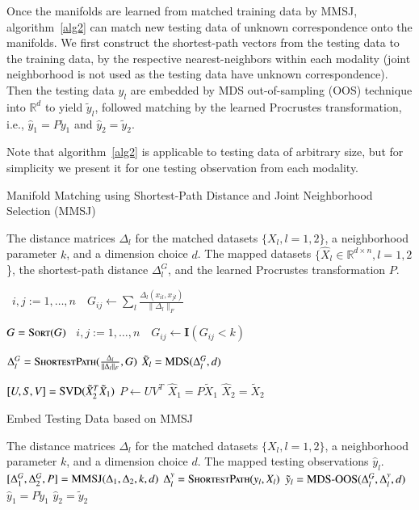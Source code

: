\documentclass[times,twocolumn,final]{elsarticle}
\newcommand{\Linefor}[2]{%
    \State \algorithmicfor\ {#1}\ \algorithmicdo\ {#2} \algorithmicend\ \algorithmicfor%
}
\newcommand{\rto}{\leftarrow}
\providecommand{\mb}[1]{\boldsymbol{#1}}
\begin{document}
Once the manifolds are learned from matched training data by MMSJ, algorithm~\ref{alg2} can match new testing data of unknown correspondence onto the manifolds. We first construct the shortest-path vectors from the testing data to the training data, by the respective nearest-neighbors within each modality (joint neighborhood is not used as the testing data have unknown correspondence). Then the testing data $y_{l}$ are embedded by MDS out-of-sampling (OOS) technique into $\mathbb{R}^{d}$ to yield $\tilde{y}_{l}$, followed matching by the learned Procrustes transformation, i.e., $\hat{y}_{1}=P \tilde{y}_{1}$ and $\hat{y}_{2}=\tilde{y}_{2}$.

Note that algorithm~\ref{alg2} is applicable to testing data of arbitrary size, but for simplicity we present it for one testing observation from each modality.

\begin{algorithm}
\caption{Manifold Matching using Shortest-Path Distance and Joint Neighborhood Selection (MMSJ)}
\label{alg1}
\begin{algorithmic}[1]
\Require The distance matrices $\Delta_{l}$ for the matched datasets $\{X_{l}, l=1,2\}$, a neighborhood parameter $k$, and a dimension choice $d$.
\Ensure The mapped datasets $\{\hat{X}_{l} \in \mathbb{R}^{d \times n}, l=1,2$\}, the shortest-path distance $\Delta_{l}^{G}$, and the learned Procrustes transformation $P$.

\Linefor{$i,j:=1,\ldots,n$}{$G_{ij} \rto \sum_{l} \frac{\Delta_{l}(x_{il},x_{jl})}{\|\Delta_{l}\|_{F}}$} 
\State $G = \textsc{Sort}(G)$ 
\Linefor{$i,j:=1,\ldots,n$}{$G_{ij} \rto \mb{I}(G_{ij} < k)$} 
\State $\Delta_{l}^{G} = \textsc{ShortestPath}(\frac{\Delta_{l}}{\|\Delta_{l}\|_{F}}, G)$ 
\State $\tilde{X}_{l}=\textsc{MDS}(\Delta_{l}^{G},d)$ 
\EndFor

\State $[U,S,V]=\textsc{SVD}(\tilde{X}_{2}^{T}\tilde{X}_{1})$ 
\State $P \rto UV^{T}$
\State $\hat{X}_{1}=P \tilde{X}_{1}$
\State $\hat{X}_{2}=\tilde{X}_{2}$
\EndFunction
\end{algorithmic}
\end{algorithm}

\begin{algorithm}
\caption{Embed Testing Data based on MMSJ}
\label{alg2}
\begin{algorithmic}
\Require The distance matrices $\Delta_{l}$ for the matched datasets $\{X_{l}, l=1,2\}$, a neighborhood parameter $k$, and a dimension choice $d$.
\Ensure The mapped testing observations $\hat{y}_{l}$. 
\State $[\Delta_{1}^{G},\Delta_{2}^{G},P]=\textsc{MMSJ}(\Delta_{1},\Delta_{2},k,d)$
\State $\Delta_{l}^{y} = \textsc{ShortestPath}(y_{l},X_{l})$ 
\State $\tilde{y}_{l}=\textsc{MDS-OOS}(\Delta_{l}^{G},\Delta_{l}^{y},d)$
\EndFor
\State $\hat{y}_{1}=P \tilde{y}_{1}$
\State $\hat{y}_{2}=\tilde{y}_{2}$
\EndFunction
\end{algorithmic}
\end{algorithm}
\end{document}
